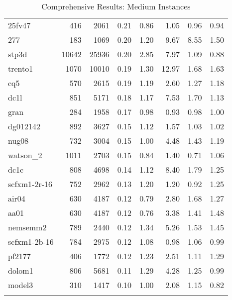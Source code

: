 \documentclass[10pt]{article}
\begin{document}
\begin{longtable}{|l|r|r|r|r|r|r|r|}
25fv47	&	416	&	2061	&	0.21	&	0.86	&	1.05	&	0.96	&	0.94	\\
277	&	183	&	1069	&	0.20	&	1.20	&	9.67	&	8.55	&	1.50	\\
stp3d	&	10642	&	25936	&	0.20	&	2.85	&	7.97	&	1.09	&	0.88	\\
trento1	&	1070	&	10010	&	0.19	&	1.30	&	12.97	&	1.68	&	1.63	\\
cq5	&	570	&	2615	&	0.19	&	1.19	&	2.60	&	1.27	&	1.18	\\
dc1l	&	851	&	5171	&	0.18	&	1.17	&	7.53	&	1.70	&	1.13	\\
gran	&	284	&	1958	&	0.17	&	0.98	&	0.93	&	0.98	&	1.00	\\
dg012142	&	892	&	3627	&	0.15	&	1.12	&	1.57	&	1.03	&	1.02	\\
nug08	&	732	&	3004	&	0.15	&	1.00	&	4.48	&	1.43	&	1.19	\\
watson\_2	&	1011	&	2703	&	0.15	&	0.84	&	1.40	&	0.71	&	1.06	\\
dc1c	&	808	&	4698	&	0.14	&	1.12	&	8.40	&	1.79	&	1.25	\\
scfxm1-2r-16	&	752	&	2962	&	0.13	&	1.20	&	1.20	&	0.92	&	1.25	\\
air04	&	630	&	4187	&	0.12	&	0.79	&	2.80	&	1.68	&	1.27	\\
aa01	&	630	&	4187	&	0.12	&	0.76	&	3.38	&	1.41	&	1.48	\\
nemsemm2	&	789	&	2440	&	0.12	&	1.34	&	5.26	&	1.53	&	1.45	\\
scfxm1-2b-16	&	784	&	2975	&	0.12	&	1.08	&	0.98	&	1.06	&	0.99	\\
pf2177	&	406	&	1772	&	0.12	&	1.23	&	2.51	&	1.11	&	1.29	\\
dolom1	&	806	&	5681	&	0.11	&	1.29	&	4.28	&	1.25	&	0.99	\\
model3	&	310	&	1417	&	0.10	&	1.00	&	2.08	&	1.15	&	0.82	\\
\hline
\caption{Comprehensive Results: Medium Instances}
\small
\centering
\label{supptab:all_medium}
\end{longtable}
\end{document}
